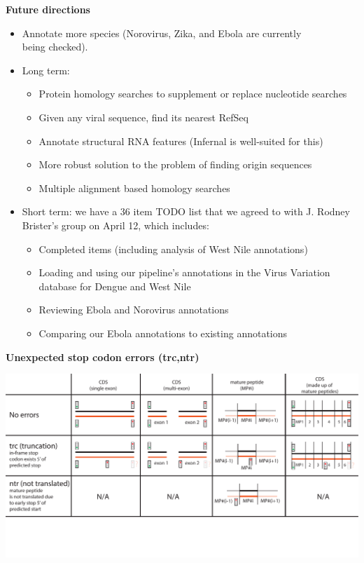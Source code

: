\documentclass[landscape]{slides}
\begin{document}
\begin{slide}
\begin{center}
\textbf{Future directions}

\small
\begin{itemize}
\item Annotate more species (Norovirus, Zika, and Ebola are currently \\ being checked).

\item Long term:
\begin{itemize}
\item  Protein homology searches to supplement or replace nucleotide searches
\item  Given any viral sequence, find its nearest RefSeq
\item  Annotate structural RNA features (Infernal is well-suited for this)
\item  More robust solution to the problem of finding origin sequences
\item  Multiple alignment based homology searches 
\end{itemize}

\item Short term: we have a 36 item TODO list that we agreed to with
  J. Rodney \\ Brister's group on April 12, which includes:
\begin{itemize}
  \item Completed items (including analysis of West Nile annotations)
  \item Loading and using our pipeline's annotations in the Virus Variation
    database for Dengue and West Nile
  \item Reviewing Ebola and Norovirus annotations
  \item Comparing our Ebola annotations to existing annotations
\end{itemize}
\end{itemize}

\vfill
\end{center}
\end{slide}
\begin{slide}
\begin{center}
\textbf{Unexpected stop codon errors (trc,ntr)}
\vspace{0.5in}

\includegraphics[width=10in]{figs/error-1-trc-ntr}
\end{center}
\vfill
\end{slide}
\end{document}

